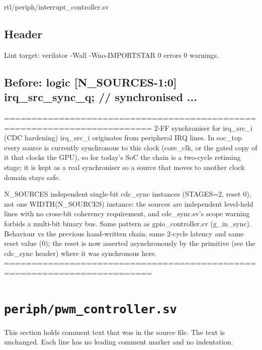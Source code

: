 \begin{relocated}{rtl/periph/interrupt_controller.sv}

\subsection*{Header}

\begin{textblock}
Lint target: verilator -Wall -Wno-IMPORTSTAR 0 errors 0 warnings.
\end{textblock}

\subsection*{Before: logic [N\_SOURCES-1:0] irq\_src\_sync\_q;   // synchronised ...}

\begin{textblock}
=========================================================================
2-FF synchroniser for irq_src_i (CDC hardening)
irq_src_i originates from peripheral IRQ lines. In soc_top every source
is currently synchronous to this clock (core_clk, or the gated copy of it
that clocks the GPU), so for today's SoC the chain is a two-cycle
retiming stage; it is kept as a real synchroniser so a source that moves
to another clock domain stays safe.

N_SOURCES independent single-bit cdc_sync instances (STAGES=2, reset
0), not one WIDTH(N_SOURCES) instance: the sources are independent
level-held lines with no cross-bit coherency requirement, and
cdc_sync.sv's scope warning forbids a multi-bit binary bus. Same
pattern as gpio_controller.sv (g_in_sync). Behaviour vs the previous
hand-written chain: same 2-cycle latency and same reset value (0); the
reset is now asserted asynchronously by the primitive (see the
cdc_sync header) where it was synchronous here.
=========================================================================
\end{textblock}

\end{relocated}

\section{\texttt{periph/pwm\_controller.sv}}\label{tm:mod:pwm-controller}

This section holds comment text that was in the source file. The text is unchanged. Each line has no leading comment marker and no indentation.

